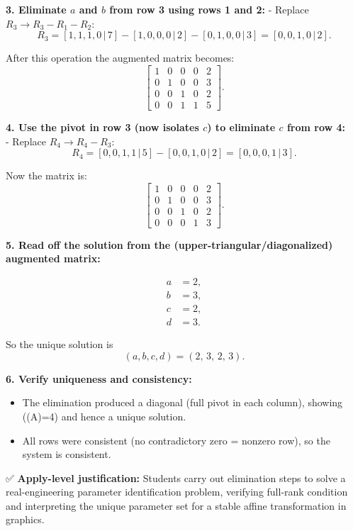 \documentclass[
  letterpaper,
  DIV=11,
  numbers=noendperiod]{scrreprt}
\providecommand{\tightlist}{%
  \setlength{\itemsep}{0pt}\setlength{\parskip}{0pt}}
\begin{document}
\textbf{3. Eliminate \(a\) and \(b\) from row 3 using rows 1 and 2:} -
Replace \(R_3 \to R_3 - R_1 - R_2\): \[
R_3 = [1,1,1,0\,|\,7] - [1,0,0,0\,|\,2] - [0,1,0,0\,|\,3] = [0,0,1,0\,|\,2].
\]

After this operation the augmented matrix becomes: \[
\left[\begin{array}{cccc|c}
1 & 0 & 0 & 0 & 2\\[4pt]
0 & 1 & 0 & 0 & 3\\[4pt]
0 & 0 & 1 & 0 & 2\\[4pt]
0 & 0 & 1 & 1 & 5
\end{array}\right].
\]

\textbf{4. Use the pivot in row 3 (now isolates \(c\)) to eliminate
\(c\) from row 4:}\\
- Replace \(R_4 \to R_4 - R_3\): \[
R_4 = [0,0,1,1\,|\,5] - [0,0,1,0\,|\,2] = [0,0,0,1\,|\,3].
\]

Now the matrix is: \[
\left[\begin{array}{cccc|c}
1 & 0 & 0 & 0 & 2\\[4pt]
0 & 1 & 0 & 0 & 3\\[4pt]
0 & 0 & 1 & 0 & 2\\[4pt]
0 & 0 & 0 & 1 & 3
\end{array}\right].
\]

\textbf{5. Read off the solution from the
(upper-triangular/diagonalized) augmented matrix:}

\[
\begin{aligned}
a &= 2,\\
b &= 3,\\
c &= 2,\\
d &= 3.
\end{aligned}
\]

So the unique solution is \[
(a,b,c,d) = (2,\,3,\,2,\,3).
\]

\textbf{6. Verify uniqueness and consistency:}

\begin{itemize}
\tightlist
\item
  The elimination produced a diagonal (full pivot in each column),
  showing ((A)=4) and hence a unique solution.\\
\item
  All rows were consistent (no contradictory zero = nonzero row), so the
  system is consistent.
\end{itemize}

✅ \textbf{Apply-level justification:} Students carry out elimination
steps to solve a real-engineering parameter identification problem,
verifying full-rank condition and interpreting the unique parameter set
for a stable affine transformation in graphics.
\end{document}
